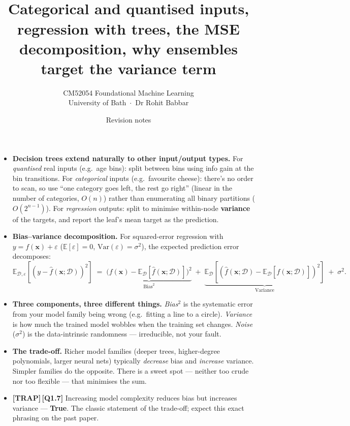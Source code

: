 \documentclass[11pt, a4paper]{article}
\title{\vspace{-1cm}{\Huge\bfseries Week 3 — Decision Trees Extended \& the Bias--Variance Tradeoff} \\[0.4em]{\large Categorical and quantised inputs, regression with trees, the MSE decomposition, why ensembles target the variance term}}
\author{\large CM52054 Foundational Machine Learning \\[0.2em]\normalsize University of Bath \,$\cdot$\, Dr Rohit Babbar}
\date{Revision notes}
\newcommand{\trapflag}{\textcolor{trapBd}{\textbf{[TRAP]}}\,}
\begin{document}
\maketitle
\thispagestyle{empty}

\vspace{1em}

\begin{tldrbox}
\begin{itemize}[leftmargin=*]
  \item \textbf{Decision trees extend naturally to other input/output types.} For \emph{quantised} real inputs (e.g.\ age bins): split between bins using info gain at the bin transitions. For \emph{categorical} inputs (e.g.\ favourite cheese): there's no order to scan, so use ``one category goes left, the rest go right'' (linear in the number of categories, $O(n)$) rather than enumerating all binary partitions ($O(2^{n-1})$). For \emph{regression} outputs: split to minimise within-node \textbf{variance} of the targets, and report the leaf's mean target as the prediction.
  \item \textbf{Bias--variance decomposition.} For squared-error regression with $y = f(\mathbf{x}) + \varepsilon$ ($\mathbb{E}[\varepsilon]=0$, $\mathrm{Var}(\varepsilon)=\sigma^2$), the expected prediction error decomposes:
  \[
  \mathbb{E}_{\mathcal{D},\varepsilon}\!\left[(y - \hat{f}(\mathbf{x};\mathcal{D}))^2\right] \;=\; \underbrace{\bigl(f(\mathbf{x}) - \mathbb{E}_{\mathcal{D}}[\hat{f}(\mathbf{x};\mathcal{D})]\bigr)^2}_{\text{Bias}^2} \;+\; \underbrace{\mathbb{E}_{\mathcal{D}}\!\left[(\hat{f}(\mathbf{x};\mathcal{D}) - \mathbb{E}_{\mathcal{D}}[\hat{f}(\mathbf{x};\mathcal{D})])^2\right]}_{\text{Variance}} \;+\; \sigma^2.
  \]
  \item \textbf{Three components, three different things.} \emph{Bias}$^2$ is the systematic error from your model family being wrong (e.g.\ fitting a line to a circle). \emph{Variance} is how much the trained model wobbles when the training set changes. \emph{Noise} ($\sigma^2$) is the data-intrinsic randomness — irreducible, not your fault.
  \item \textbf{The trade-off.} Richer model families (deeper trees, higher-degree polynomials, larger neural nets) typically \emph{decrease} bias and \emph{increase} variance. Simpler families do the opposite. There is a sweet spot — neither too crude nor too flexible — that minimises the sum.
  \item \trapflag{}\textbf{[Q1.7]} Increasing model complexity reduces bias but increases variance — \textbf{True}. The classic statement of the trade-off; expect this exact phrasing on the past paper.

\end{itemize}
\end{tldrbox}
\end{document}
